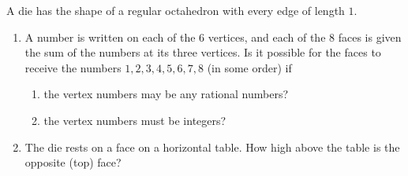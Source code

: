 A die has the shape of a regular octahedron with every edge of length $1$.
\begin{enumerate}
\item[(a)] A number is written on each of the $6$ vertices, and each of the $8$ faces is given the sum of the numbers at its three vertices. Is it possible for the faces to receive the numbers $1,2,3,4,5,6,7,8$ (in some order) if
  \begin{enumerate}
  \item[(i)] the vertex numbers may be any rational numbers?
  \item[(ii)] the vertex numbers must be integers?
  \end{enumerate}
\item[(b)] The die rests on a face on a horizontal table. How high above the table is the opposite (top) face?
\end{enumerate}
